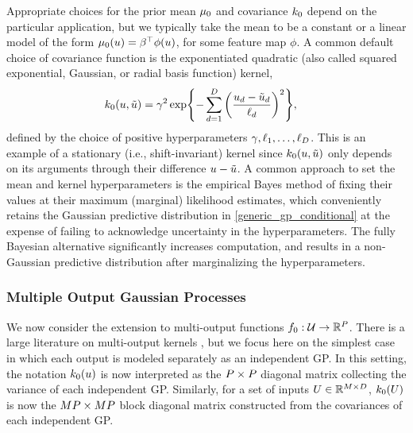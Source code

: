 \documentclass[12pt]{article}
\begin{document}
Appropriate choices for the prior mean $\mu_0$ and covariance $k_0$ depend on the 
particular application, but we typically take the mean to be a constant or a linear model of the form 
$\mu_0(u) = \beta^\top \phi(u)$, for some feature map $\phi$. A common default choice of 
covariance function is the exponentiated quadratic (also called squared exponential, Gaussian, or radial basis function)
kernel,
\begin{align}
k_0(u, \tilde{u}) &= 
\gamma^2 \exp\mathopen{}\left\{- \sum_{d=1}^{D} \left(\frac{u_{d} - \tilde{u}_{d}}{\ell_{d}} \right)^2\right\}\mathclose{}, \label{Gaussian_kernel}
\end{align}
defined by the choice of positive hyperparameters $\gamma, \ell_{1}, \dots, \ell_{D}$. 
This is an example of a stationary (i.e., shift-invariant) kernel since $k_0(u, \tilde{u})$ only depends 
on its arguments through their difference $u - \tilde{u}$. 
A common approach to set the mean and kernel hyperparameters is the empirical Bayes method of fixing
their values at their maximum (marginal) likelihood estimates, which conveniently retains the Gaussian
predictive distribution in \cref{generic_gp_conditional} at the expense of failing to acknowledge uncertainty
in the hyperparameters. The fully Bayesian alternative significantly increases computation, 
and results in a non-Gaussian predictive distribution after marginalizing the hyperparameters. 

\subsubsection{Multiple Output Gaussian Processes}
We now consider the extension to multi-output functions $f_{0}: \mathcal{U} \to \mathbb{R}^{P}$. 
There is a large literature on multi-output kernels \citep{multiOutputKernels}, but we focus here on the 
simplest case in which each output is modeled separately as an independent GP. 
In this setting, the notation $k_0(u)$ is now interpreted as the $P \times P$ 
diagonal matrix collecting the variance of each independent GP. Similarly, for a set of inputs 
$U \in \mathbb{R}^{M \times D}$, $k_0(U)$ is now the 
$MP \times MP$ block diagonal matrix constructed from the covariances of 
each independent GP.
 
\end{document}
